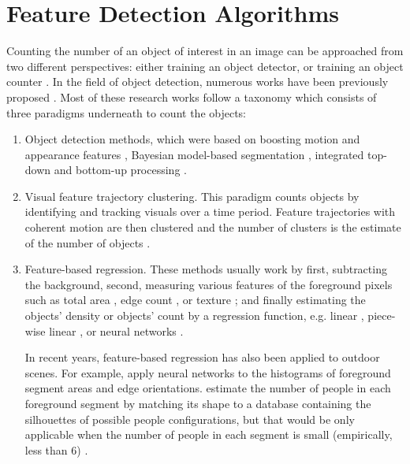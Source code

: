 \section{Feature Detection Algorithms} 
\label{fda}
Counting the number of an object of interest in an image can be approached from two different perspectives: either training an object detector, or training an object counter \cite{segui2015learning}. In the field of object detection, numerous works have been previously proposed \cite{paragios2001mrf, cho1999neural, regazzoni1996distributed, davies1995crowd, kong2005counting, marana1998efficacy, viola2004robust}. Most of these research works follow a taxonomy which consists of three paradigms underneath to count the objects:

\begin{enumerate}
	\item Object detection methods, which were based on boosting motion and appearance features \cite{viola2005detecting, viola2004robust}, Bayesian model-based segmentation \cite{zhao2003bayesian}, integrated top-down and bottom-up processing \cite{leibe2005pedestrian, oliva2003top,chan2008privacy}.
	\item Visual feature trajectory clustering. This paradigm counts objects by identifying and tracking visuals over a  time period. Feature trajectories with coherent motion are then clustered and the number of clusters is the estimate of the number of objects \cite{rabaud2006counting, brostow2006unsupervised,chan2008privacy}. 

	\item Feature-based regression. These methods usually work by first, subtracting the background, second, measuring various features of the foreground pixels such as total area \cite{paragios2001mrf, davies1995crowd}, edge count \cite{cho1999neural, regazzoni1996distributed}, or texture  \cite{marana1998efficacy}; and finally estimating the objects' density or objects' count by a regression function, e.g. linear \cite{paragios2001mrf, davies1995crowd}, piece-wise linear \cite{regazzoni1996distributed}, or neural networks \cite{cho1999neural, regazzoni1996distributed}. 

	\indent In recent years, feature-based regression has also been applied to outdoor scenes. For example, \citealt{kong2005counting} apply neural networks to the histograms of foreground segment areas and edge orientations. \citealt{dong2007fast} estimate the number of people in each foreground segment by matching its shape to a database containing the silhouettes of possible people configurations, but that would be only applicable when the number of people in each segment is small (empirically, less than 6) \cite{chan2008privacy}.  
\end{enumerate} 
